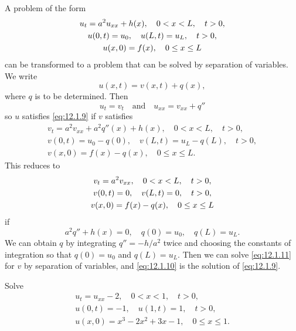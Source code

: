
A problem of the form
\begin{gather}
u_t=a^2u_{xx}+h(x),\quad 0<x<L,\quad t>0,\notag\\
u(0,t)=u_0,\quad u(L,t)=u_L,\quad t>0,\label{eq:12.1.9}\\
u(x,0)=f(x),\quad 0\le x\le L\notag
\end{gather}
can be transformed to a problem that can be solved by separation of
variables. We write
\begin{equation} \label{eq:12.1.10}
u(x,t)=v(x,t)+q(x),
\end{equation}
where $q$ is to be
determined.  Then
\[
u_t=v_t\quad\text{and}\quad u_{xx}=v_{xx}+q''
\]
so $u$ satisfies \eqref{eq:12.1.9} if $v$ satisfies
\begin{gather*}
v_t=a^2v_{xx}+a^2q''(x)+h(x),\quad 0<x<L,\quad t>0,\\
v(0,t)=u_0-q(0),\quad v(L,t)=u_L-q(L),\quad t>0,\\
v(x,0)=f(x)-q(x),\quad 0\le x\le L.
\end{gather*}
This reduces to
\begin{gather}
v_t=a^2v_{xx},\quad 0<x<L,\quad t>0,\notag\\
v(0,t)=0,\quad v(L,t)=0,\quad t>0,\label{eq:12.1.11}\\
v(x,0)=f(x)-q(x),\quad 0\le x\le L\notag
\end{gather}
if
\[
a^2q''+h(x)=0,\quad q(0)=u_0,\quad q(L)=u_L.
\]
We can obtain $q$ by integrating $q''=-h/a^2$ twice and choosing the
constants of integration so that $q(0)=u_0$ and $q(L)=u_L$.
Then we can solve \eqref{eq:12.1.11} for $v$ by  separation of variables,
and \eqref{eq:12.1.10} is the solution of \eqref{eq:12.1.9}.


\begin{example}\label{example:12.1.5}
Solve
\begin{gather*}
u_t=u_{xx}-2,\quad 0<x<1,\quad t>0,\\
u(0,t)=-1,\quad u(1,t)=1,\quad t>0,\\
 u(x,0)=x^3-2x^2+3x-1,\quad 0\le x\le1.
\end{gather*}
\end{example}

